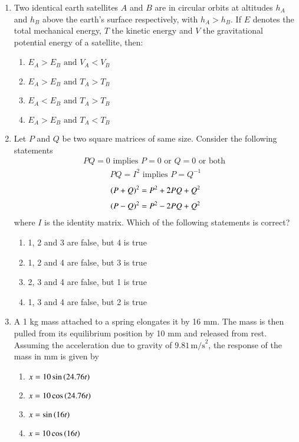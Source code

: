 \documentclass[journal]{IEEEtran}
\theoremstyle{remark}
\begin{document}
\begin{enumerate}[start=18]
\item  Two identical earth satellites $A$ and $B$ are in circular orbits at altitudes $h_A$ and $h_B$ above the earth's surface respectively, with $h_A > h_B$. If $E$ denotes the total mechanical energy, $T$ the kinetic energy and $V$ the gravitational potential energy of a satellite, then:
\begin{multicols}{2}
\begin{enumerate}
\item $E_A > E_B \text{ and } V_A < V_B$
\item $E_A > E_B \text{ and } T_A > T_B$
\item $E_A < E_B \text{ and } T_A > T_B$
\item $E_A > E_B \text{ and } T_A < T_B$
\end{enumerate}
\end{multicols}

\item  Let $P$ and $Q$ be two square matrices of same size. Consider the following statements
\begin{align}
    PQ=0 \text{ implies } P=0 \text{ or } Q=0 \text{ or both }
\end{align}
\begin{align}
    PQ=I^2 \text{ implies } P=Q^{-1}
\end{align}
\begin{align}
    {\ensuremath{\left(P+Q\right)}}^2 =P^2+2PQ+Q^2
\end{align}
\begin{align}
     {\ensuremath{\left(P-Q\right)}}^2 =P^2-2PQ+Q^2
\end{align}
where $I$ is the identity matrix. Which of the following statements is correct?
\begin{multicols}{2}
\begin{enumerate}
\item 1, 2 and 3 are false, but 4 is true
\item 1, 2 and 4 are false, but 3 is true
\item 2, 3 and 4 are false, but 1 is true 
\item 1, 3 and 4 are false, but 2 is true
\end{enumerate}
\end{multicols}

\item   A 1 kg mass attached to a spring elongates it by 16 mm. The mass is then pulled from its equilibrium position by 10 mm and released from rest. Assuming the acceleration due to gravity of $9.81 \, \text{m/s}^2$, the response of the mass in mm is given by
\begin{multicols}{2}
\begin{enumerate}
\item $x=10 \sin\left(24.76t\right)$
\item $x=10 \cos\left(24.76t\right)$
\item $x=\sin\left(16t\right)$
\item $x=10\cos\left(16t\right)$
\end{enumerate}
\end{multicols}


\end{enumerate}
\end{document}
